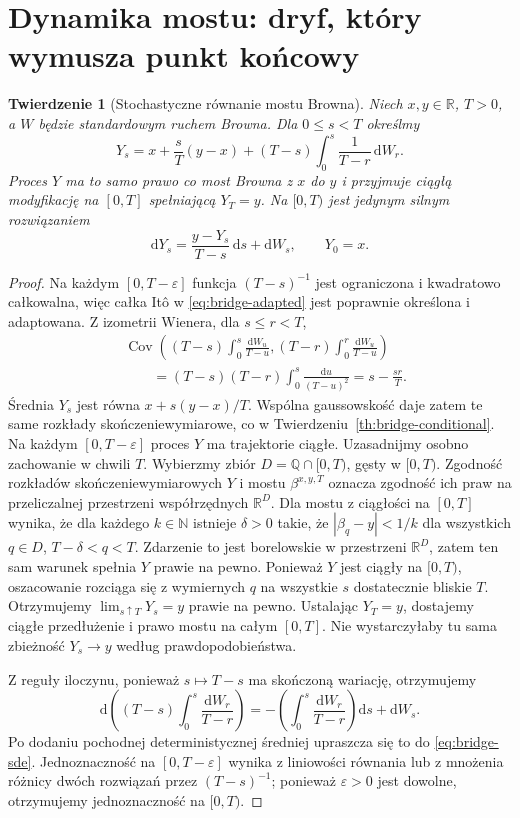 \documentclass[11pt,a4paper,oneside]{report}
\numberwithin{equation}{chapter}
\theoremstyle{plain}
\newtheorem{twierdzenie}{Twierdzenie}[chapter]
\theoremstyle{definition}
\theoremstyle{remark}
\newcommand{\R}{\mathbb{R}}
\newcommand{\N}{\mathbb{N}}
\newcommand{\Cov}{\operatorname{Cov}}
\newcommand{\dd}{\mathrm{d}}
\begin{document}
\section{Dynamika mostu: dryf, który wymusza punkt końcowy}

\begin{twierdzenie}[Stochastyczne równanie mostu Browna]
\label{th:bridge-sde}
Niech $x,y\in\R$, $T>0$, a $W$ będzie standardowym
ruchem Browna. Dla $0\le s<T$ określmy
\[
 Y_s=x+\frac{s}{T}(y-x)+(T-s)\int_0^s\frac1{T-r}\,\dd W_r.
\tag{15.4}\label{eq:bridge-adapted}
\]
Proces $Y$ ma to samo prawo co most Browna z $x$ do $y$
i przyjmuje ciągłą modyfikację na $[0,T]$ spełniającą
$Y_T=y$. Na $[0,T)$ jest jedynym silnym rozwiązaniem
\[
 \dd Y_s=\frac{y-Y_s}{T-s}\,\dd s+\dd W_s,
 \qquad Y_0=x.
\tag{15.5}\label{eq:bridge-sde}
\]
\end{twierdzenie}
\begin{proof}
Na każdym $[0,T-\varepsilon]$ funkcja
$(T-s)^{-1}$ jest ograniczona i kwadratowo całkowalna,
więc całka Itô w \eqref{eq:bridge-adapted} jest
poprawnie określona i adaptowana. Z izometrii Wienera,
dla $s\le r<T$,
\[
\begin{split}
&\Cov\left((T-s)\int_0^s\frac{\dd W_u}{T-u},
 (T-r)\int_0^r\frac{\dd W_u}{T-u}\right)\\
&\qquad=(T-s)(T-r)\int_0^s\frac{\dd u}{(T-u)^2}
 =s-\frac{sr}{T}.
\end{split}
\]
Średnia $Y_s$ jest równa $x+s(y-x)/T$.
Wspólna gaussowskość daje zatem te same rozkłady
skończeniewymiarowe, co w
Twierdzeniu~\ref{th:bridge-conditional}.
Na każdym $[0,T-\varepsilon]$ proces $Y$ ma trajektorie
ciągłe. Uzasadnijmy osobno zachowanie w chwili $T$.
Wybierzmy zbiór $D=\mathbb Q\cap[0,T)$, gęsty w $[0,T)$.
Zgodność rozkładów skończeniewymiarowych $Y$ i mostu
$\beta^{x,y,T}$ oznacza zgodność ich praw na
przeliczalnej przestrzeni współrzędnych $\mathbb R^D$.
Dla mostu z ciągłości na $[0,T]$ wynika, że dla każdego
$k\in\N$ istnieje $\delta>0$ takie, że
$|\beta_q-y|<1/k$ dla wszystkich $q\in D$,
$T-\delta<q<T$. Zdarzenie to jest borelowskie
w przestrzeni $\mathbb R^D$, zatem ten sam warunek
spełnia $Y$ prawie na pewno. Ponieważ $Y$ jest ciągły
na $[0,T)$, oszacowanie rozciąga się z wymiernych $q$
na wszystkie $s$ dostatecznie bliskie $T$. Otrzymujemy
$\lim_{s\uparrow T}Y_s=y$ prawie na pewno. Ustalając
$Y_T=y$, dostajemy ciągłe przedłużenie i prawo mostu
na całym $[0,T]$. Nie wystarczyłaby tu sama zbieżność
$Y_s\to y$ według prawdopodobieństwa.

Z reguły iloczynu, ponieważ $s\mapsto T-s$ ma
skończoną wariację, otrzymujemy
\[
\dd\left((T-s)\int_0^s\frac{\dd W_r}{T-r}\right)
 =-\left(\int_0^s\frac{\dd W_r}{T-r}\right)\dd s+\dd W_s.
\]
Po dodaniu pochodnej deterministycznej średniej
upraszcza się to do \eqref{eq:bridge-sde}.
Jednoznaczność na $[0,T-\varepsilon]$ wynika z
liniowości równania lub z mnożenia różnicy dwóch
rozwiązań przez $(T-s)^{-1}$; ponieważ
$\varepsilon>0$ jest dowolne, otrzymujemy
jednoznaczność na $[0,T)$.
\end{proof}
\end{document}
